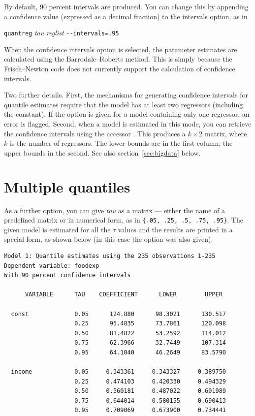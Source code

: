 By default, 90 percent intervals are produced.  You can change this by
appending a confidence value (expressed as a decimal fraction) to the
intervals option, as in

\vspace{1em}
\noindent
\qquad \texttt{quantreg} \textsl{tau} \textsl{reglist} \verb|--intervals=.95|
\vspace{1em}

When the confidence intervals option is selected, the parameter
estimates are calculated using the Barrodale--Roberts method.  This is
simply because the Frisch--Newton code does not currently support the
calculation of confidence intervals.

Two further details.  First, the mechanisms for generating confidence
intervals for quantile estimates require that the model has at least
two regressors (including the constant).  If the 
option is given for a model containing only one regressor, an error is
flagged.  Second, when a model is estimated in this mode, you can
retrieve the confidence intervals using the accessor .
This produces a $k \times 2$ matrix, where $k$ is the number of
regressors.  The lower bounds are in the first column, the upper
bounds in the second.  See also section~\ref{sec:bigdata} below.

\section{Multiple quantiles}

As a further option, you can give \textsl{tau} as a matrix --- either
the name of a predefined matrix or in numerical form, as in
\verb+{.05, .25, .5, .75, .95}+.  The given model is estimated for all
the $\tau$ values and the results are printed in a special form, as
shown below (in this case the  option was also
given).

{\small
\begin{verbatim}
Model 1: Quantile estimates using the 235 observations 1-235
Dependent variable: foodexp
With 90 percent confidence intervals

      VARIABLE      TAU    COEFFICIENT      LOWER        UPPER

  const             0.05      124.880      98.3021      130.517
                    0.25      95.4835      73.7861      120.098
                    0.50      81.4822      53.2592      114.012
                    0.75      62.3966      32.7449      107.314
                    0.95      64.1040      46.2649      83.5790

  income            0.05     0.343361     0.343327     0.389750
                    0.25     0.474103     0.420330     0.494329
                    0.50     0.560181     0.487022     0.601989
                    0.75     0.644014     0.580155     0.690413
                    0.95     0.709069     0.673900     0.734441
\end{verbatim}
}


